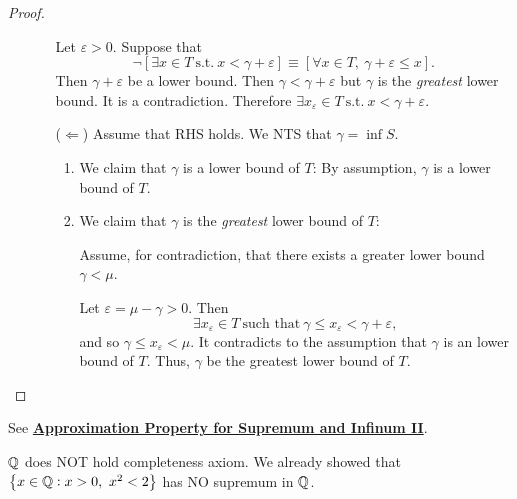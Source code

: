 \documentclass[11pt,openany]{article}
\begin{document}
\begin{proof}
\begin{enumerate}[(1)]
\begin{itemize}
			Let $\varepsilon>0$. Suppose that \[
			\lnot[\exists x\in T\ \text{s.t.}\ x<\gamma+\varepsilon]\equiv[\forall x\in T,\ \gamma+\varepsilon\leq x].
			\] Then $\gamma+\varepsilon$ be a lower bound. Then $\gamma<\gamma+\varepsilon$ but $\gamma$ is the \textit{greatest} lower bound. It is a contradiction. Therefore $\exists x_\varepsilon\in T\ \text{s.t.}\ x<\gamma+\varepsilon$. 
			\vspace{10pt}
			\item[($\Leftarrow$)] Assume that RHS holds. We NTS that $\gamma=\inf S$.
			\begin{enumerate}
				\item We claim that $\gamma$ is a lower bound of $T$: By assumption, $\gamma$ is a lower bound of $T$.
				\item We claim that $\gamma$ is the \textit{greatest} lower bound of $T$:\par
				\begin{center}
					
				\end{center}
				Assume, for contradiction, that there exists a greater lower bound $\gamma<\mu$.\par
				Let $\varepsilon=\mu-\gamma>0$. Then \[
				\exists x_\varepsilon\in T\ \text{such that}\ \gamma\leq x_\varepsilon<\gamma+\varepsilon,
				\] and so $ \gamma \leq x_\varepsilon<\mu$. It contradicts to the assumption that $\gamma$ is an lower bound of $T$. Thus, $\gamma$ be the greatest lower bound of $T$.
			\end{enumerate}
		\end{itemize}
	\end{enumerate}
\end{proof}

\begin{remark*}
	See \hyperlink{pro2}{\bf Approximation Property for Supremum and Infinum II}.
\end{remark*}
\vfill
{}
\begin{example*}
	$\mathbb{Q}$ does NOT hold completeness axiom. We already showed that $\set{x\in\mathbb{Q}:x>0,\ x^2<2}$ has NO supremum in $\mathbb{Q}$.
\end{example*}
\vfill
{}
\end{document}

